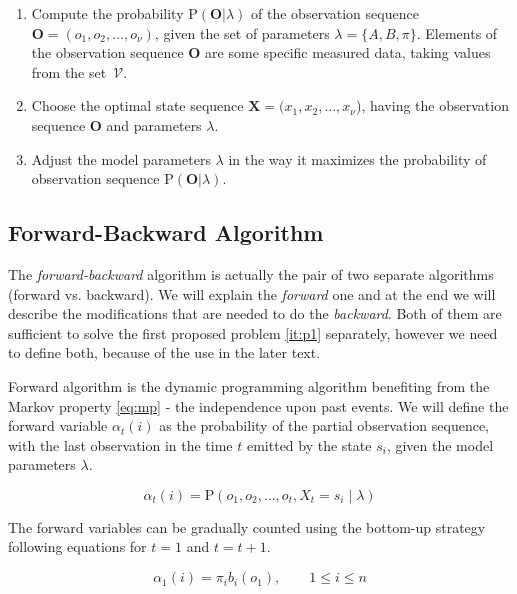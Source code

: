 \documentclass[thesis=M,english]{FITthesis}[2012/10/20]
\newcommand{\matr}[1]{\mathbf{#1}}
\begin{document}
\begin{enumerate}
\item Compute the probability $\mathrm{P}(\matr{O}|\lambda) $ of the observation sequence \\ $\matr{O} = (o_1,o_2,\dots,o_{\nu})$, given the set of parameters $\lambda = \{A,B,\pi\}$. Elements of the observation sequence $\matr{O}$ are some specific measured data, taking values from the set~$\mathcal{V}$. \label{it:p1}  
\item Choose the optimal state sequence $\matr{X} = (x_1,x_2,\dots,x_{\nu}$), having the observation sequence $\matr{O}$ and parameters $\lambda$. \label{it:p2} 
\item Adjust the model parameters $\lambda$ in the way it maximizes the probability of observation sequence $ \mathrm{P}(\matr{O}|\lambda) $. \label{it:p3} 
\end{enumerate}


\subsection{Forward-Backward Algorithm}\label{sec:fb}
The \textit{forward-backward} algorithm is actually the pair of two separate algorithms (forward vs. backward). We will explain the \textit{forward} one and at the end we will describe the modifications that are needed to do the \textit{backward}. Both of them are sufficient to solve the first proposed problem \ref{it:p1} separately, however we need to define both, because of the use in the later text.  

Forward algorithm is the dynamic programming algorithm benefiting from the Markov property \eqref{eq:mp} - the independence upon past events. We will define the forward variable $\alpha_t(i)$ as the probability of the partial observation sequence, with the last observation in the time $t$ emitted by the state $s_i$, given the model parameters $\lambda$.

\begin{equation}
\alpha_t(i) = \mathrm{P}(o_1,o_2,\dots,o_t,X_t = s_i \mid \lambda )
\end{equation}

The forward variables can be gradually counted using the bottom-up strategy following equations for $t=1$ and $t=t+1$.

\begin{equation}
\alpha_1(i) = \pi_i b_i(o_1), \qquad 1 \leq i \leq n
\end{equation}
\end{document}
